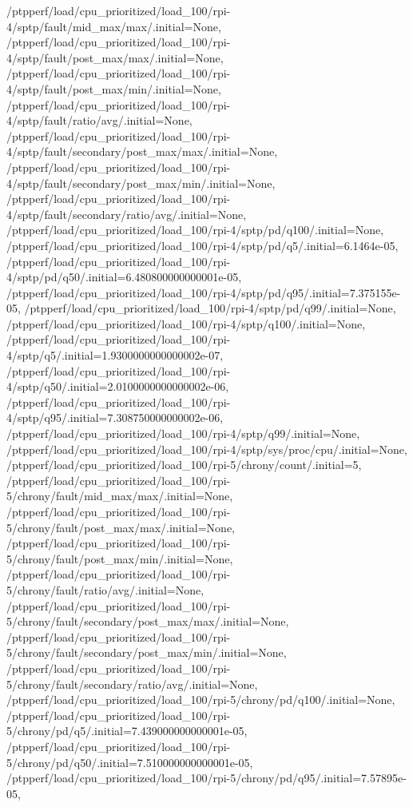 {    /ptpperf/load/cpu_prioritized/load_100/rpi-4/sptp/fault/mid_max/max/.initial=None,
    /ptpperf/load/cpu_prioritized/load_100/rpi-4/sptp/fault/post_max/max/.initial=None,
    /ptpperf/load/cpu_prioritized/load_100/rpi-4/sptp/fault/post_max/min/.initial=None,
    /ptpperf/load/cpu_prioritized/load_100/rpi-4/sptp/fault/ratio/avg/.initial=None,
    /ptpperf/load/cpu_prioritized/load_100/rpi-4/sptp/fault/secondary/post_max/max/.initial=None,
    /ptpperf/load/cpu_prioritized/load_100/rpi-4/sptp/fault/secondary/post_max/min/.initial=None,
    /ptpperf/load/cpu_prioritized/load_100/rpi-4/sptp/fault/secondary/ratio/avg/.initial=None,
    /ptpperf/load/cpu_prioritized/load_100/rpi-4/sptp/pd/q100/.initial=None,
    /ptpperf/load/cpu_prioritized/load_100/rpi-4/sptp/pd/q5/.initial=6.1464e-05,
    /ptpperf/load/cpu_prioritized/load_100/rpi-4/sptp/pd/q50/.initial=6.480800000000001e-05,
    /ptpperf/load/cpu_prioritized/load_100/rpi-4/sptp/pd/q95/.initial=7.375155e-05,
    /ptpperf/load/cpu_prioritized/load_100/rpi-4/sptp/pd/q99/.initial=None,
    /ptpperf/load/cpu_prioritized/load_100/rpi-4/sptp/q100/.initial=None,
    /ptpperf/load/cpu_prioritized/load_100/rpi-4/sptp/q5/.initial=1.9300000000000002e-07,
    /ptpperf/load/cpu_prioritized/load_100/rpi-4/sptp/q50/.initial=2.0100000000000002e-06,
    /ptpperf/load/cpu_prioritized/load_100/rpi-4/sptp/q95/.initial=7.308750000000002e-06,
    /ptpperf/load/cpu_prioritized/load_100/rpi-4/sptp/q99/.initial=None,
    /ptpperf/load/cpu_prioritized/load_100/rpi-4/sptp/sys/proc/cpu/.initial=None,
    /ptpperf/load/cpu_prioritized/load_100/rpi-5/chrony/count/.initial=5,
    /ptpperf/load/cpu_prioritized/load_100/rpi-5/chrony/fault/mid_max/max/.initial=None,
    /ptpperf/load/cpu_prioritized/load_100/rpi-5/chrony/fault/post_max/max/.initial=None,
    /ptpperf/load/cpu_prioritized/load_100/rpi-5/chrony/fault/post_max/min/.initial=None,
    /ptpperf/load/cpu_prioritized/load_100/rpi-5/chrony/fault/ratio/avg/.initial=None,
    /ptpperf/load/cpu_prioritized/load_100/rpi-5/chrony/fault/secondary/post_max/max/.initial=None,
    /ptpperf/load/cpu_prioritized/load_100/rpi-5/chrony/fault/secondary/post_max/min/.initial=None,
    /ptpperf/load/cpu_prioritized/load_100/rpi-5/chrony/fault/secondary/ratio/avg/.initial=None,
    /ptpperf/load/cpu_prioritized/load_100/rpi-5/chrony/pd/q100/.initial=None,
    /ptpperf/load/cpu_prioritized/load_100/rpi-5/chrony/pd/q5/.initial=7.439000000000001e-05,
    /ptpperf/load/cpu_prioritized/load_100/rpi-5/chrony/pd/q50/.initial=7.510000000000001e-05,
    /ptpperf/load/cpu_prioritized/load_100/rpi-5/chrony/pd/q95/.initial=7.57895e-05,
}

